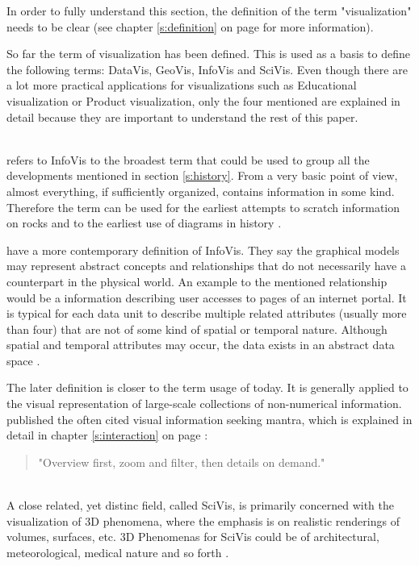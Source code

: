 In order to fully understand this section, the definition of the term "visualization" needs to be clear (see chapter \ref{s:definition} on page \pageref{s:definition} for more information).

So far the term of visualization has been defined. This is used as a basis to define the following terms: \ac{DataVis}, \ac{GeoVis}, \ac{InfoVis} and \ac{SciVis}. Even though there are a lot more practical applications for visualizations such as Educational visualization or Product visualization, only the four mentioned are explained in detail because they are important to understand the rest of this paper.

\begin{enumerate}

 \hfill \\
\citeauthor{Friendly.2001} refers to \ac{InfoVis} to the broadest term that could be used to group all the developments mentioned in section \ref{s:history}. From a very basic point of view, almost everything, if sufficiently organized, contains information in some kind. Therefore the term can be used for the earliest attempts to scratch information on rocks and to the earliest use of diagrams in history .

\citeauthor{Ferreira2003} have a more contemporary definition of \ac{InfoVis}. They say the graphical models may represent abstract concepts and relationships that do not necessarily have a counterpart in the physical world. An example to the mentioned relationship would be a information describing user accesses to pages of an internet portal. It is typical for each data unit to describe multiple related attributes (usually more than four) that are not of some kind of spatial or temporal nature. Although spatial and temporal attributes may occur, the data exists in an abstract data space .

The later definition is closer to the term usage of today. It is generally applied to the visual representation of large-scale collections of non-numerical information. \citeauthor{Shneiderman1996} published the often cited visual information seeking mantra, which is explained in detail in chapter \ref{s:interaction} on page \pageref{s:interaction} :
\begin{quote}
"Overview first, zoom and filter, then details on demand."
\end{quote}

 \hfill \\
A close related, yet distinc field, called \ac{SciVis}, is primarily concerned with the visualization of 3D phenomena, where the emphasis is on realistic renderings of volumes, surfaces, etc. 3D Phenomenas for \ac{SciVis} could be of architectural, meteorological, medical nature and so forth .


\end{enumerate}
